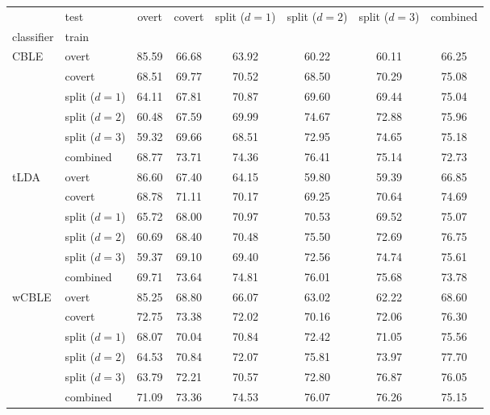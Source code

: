 \begin{tabular}{@{}llcccccc@{}}
\toprule
 & test & overt & covert & split ($d=1$) & split ($d=2$) & split ($d=3$) & combined \\
classifier & train &  &  &  &  &  &  \\
\midrule
\multirow[t]{6}{*}{CBLE} & overt & 85.59 & 66.68 & 63.92 & 60.22 & 60.11 & 66.25 \\
 & covert & 68.51 & 69.77 & 70.52 & 68.50 & 70.29 & 75.08 \\
 & split ($d=1$) & 64.11 & 67.81 & 70.87 & 69.60 & 69.44 & 75.04 \\
 & split ($d=2$) & 60.48 & 67.59 & 69.99 & 74.67 & 72.88 & 75.96 \\
 & split ($d=3$) & 59.32 & 69.66 & 68.51 & 72.95 & 74.65 & 75.18 \\
 & combined & 68.77 & 73.71 & 74.36 & 76.41 & 75.14 & 72.73 \\
\cline{1-8}
\multirow[t]{6}{*}{tLDA} & overt & 86.60 & 67.40 & 64.15 & 59.80 & 59.39 & 66.85 \\
 & covert & 68.78 & 71.11 & 70.17 & 69.25 & 70.64 & 74.69 \\
 & split ($d=1$) & 65.72 & 68.00 & 70.97 & 70.53 & 69.52 & 75.07 \\
 & split ($d=2$) & 60.69 & 68.40 & 70.48 & 75.50 & 72.69 & 76.75 \\
 & split ($d=3$) & 59.37 & 69.10 & 69.40 & 72.56 & 74.74 & 75.61 \\
 & combined & 69.71 & 73.64 & 74.81 & 76.01 & 75.68 & 73.78 \\
\cline{1-8}
\multirow[t]{6}{*}{wCBLE} & overt & 85.25 & 68.80 & 66.07 & 63.02 & 62.22 & 68.60 \\
 & covert & 72.75 & 73.38 & 72.02 & 70.16 & 72.06 & 76.30 \\
 & split ($d=1$) & 68.07 & 70.04 & 70.84 & 72.42 & 71.05 & 75.56 \\
 & split ($d=2$) & 64.53 & 70.84 & 72.07 & 75.81 & 73.97 & 77.70 \\
 & split ($d=3$) & 63.79 & 72.21 & 70.57 & 72.80 & 76.87 & 76.05 \\
 & combined & 71.09 & 73.36 & 74.53 & 76.07 & 76.26 & 75.15 \\
\cline{1-8}
\bottomrule
\end{tabular}
